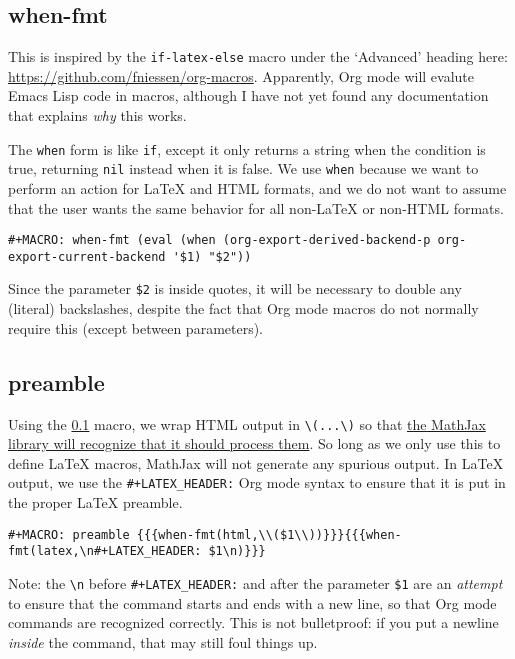\documentclass[11pt]{article}
\begin{document}
\subsection{when-fmt}
\label{sec-1-1}

This is inspired by the \verb~if-latex-else~ macro under the `Advanced'
heading here: \url{https://github.com/fniessen/org-macros}. Apparently,
Org mode will evalute Emacs Lisp code in macros, although I have not
yet found any documentation that explains \emph{why} this works.

The \verb~when~ form is like \verb~if~, except it only returns a string when the
condition is true, returning \verb~nil~ instead when it is false.  We use
\verb~when~ because we want to perform an action for \LaTeX{} and HTML
formats, and we do not want to assume that the user wants the same
behavior for all non-\LaTeX{} or non-HTML formats.

\begin{verbatim}
#+MACRO: when-fmt (eval (when (org-export-derived-backend-p org-export-current-backend '$1) "$2"))
\end{verbatim}

Since the parameter \verb~$2~ is inside quotes, it will be necessary to
double any (literal) backslashes, despite the fact that Org mode
macros do not normally require this (except between parameters).

\subsection{preamble}
\label{sec-1-2}

Using the \ref{sec-1-1} macro, we wrap HTML output in \verb~\(...\)~ so that \href{http://docs.mathjax.org/en/latest/tex.html#defining-tex-macros}{the
MathJax library will recognize that it should process them}.  So long
as we only use this to define \LaTeX{} macros, MathJax will not generate
any spurious output.  In \LaTeX{} output, we use the \verb~#+LATEX_HEADER:~
Org mode syntax to ensure that it is put in the proper \LaTeX{} preamble.

\begin{verbatim}
#+MACRO: preamble {{{when-fmt(html,\\($1\\))}}}{{{when-fmt(latex,\n#+LATEX_HEADER: $1\n)}}}
\end{verbatim}

Note: the \verb~\n~ before \verb~#+LATEX_HEADER:~ and after the parameter \verb~$1~
are an \emph{attempt} to ensure that the command starts and ends with a new
line, so that Org mode commands are recognized correctly.  This is not
bulletproof: if you put a newline \emph{inside} the command, that may still
foul things up.
\end{document}
